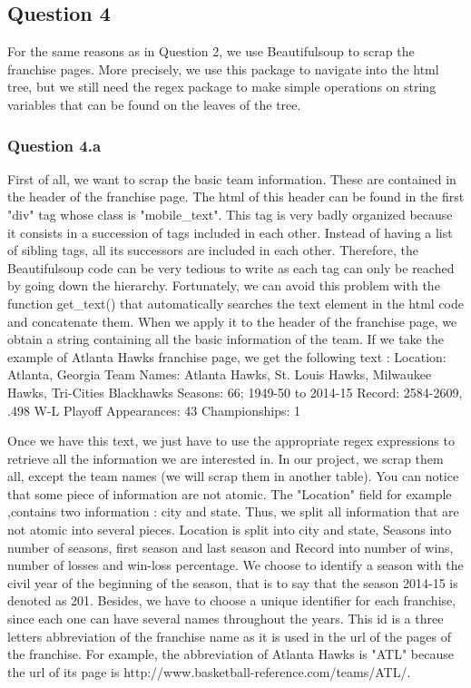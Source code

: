 
\subsection{Question 4}
\label{subsec:314}
For the same reasons as in Question 2, we use Beautifulsoup to scrap the franchise pages. More precisely, we use this package to navigate into the html tree, but we still need the regex package to make simple operations on string variables that can be found on the leaves of the tree.
\subsubsection{Question 4.a}
\label{subsubsec:314a}
First of all, we want to scrap the basic team information. These are contained in the header of the franchise page. The html of this header can be found in the first "div" tag whose class is "mobile_text". This tag is very badly organized because it consists in a succession of tags included in each other. Instead of having a list of sibling tags, all its successors are included in each other. Therefore, the Beautifulsoup code can be very tedious to write as each tag can only be reached by going down the hierarchy. Fortunately, we can avoid this problem with the function get_text() that automatically searches the text element in the html code and concatenate them. When we apply it to the header of the franchise page, we obtain a string containing all the basic information of the team. If we take the example of Atlanta Hawks franchise page, we get the following text :
Location: Atlanta, Georgia 
Team Names: Atlanta Hawks, St. Louis Hawks, Milwaukee Hawks, Tri-Cities Blackhawks
Seasons: 66; 1949-50 to 2014-15 
Record: 2584-2609, .498 W-L%
Playoff Appearances: 43 
Championships: 1

Once we have this text, we just have to use the appropriate regex expressions to retrieve all the information we are interested in. In our project, we scrap them all, except the team names (we will scrap them in another table). You can notice that some piece of information are not atomic. The "Location" field for example ,contains two information : city and state. Thus, we split all information that are not atomic into several pieces. Location is split into city and state, Seasons into number of seasons, first season and last season and Record into number of wins, number of losses and win-loss percentage. We choose to identify a season with the civil year of the beginning of the season, that is to say that the season 2014-15 is denoted as 201. Besides, we have to choose a unique identifier for each franchise, since each one can have several names throughout the years. This id is a three letters abbreviation of the franchise name as it is used in the url of the pages of the franchise. For example, the abbreviation of Atlanta Hawks is "ATL" because the url of its page is http://www.basketball-reference.com/teams/ATL/.

